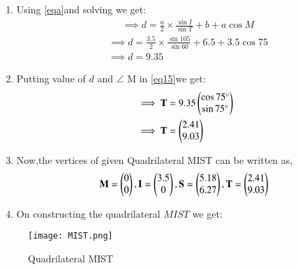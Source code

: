 \documentclass[journal,12pt,twocolumn]{IEEEtran}
\begin{document}
\begin{enumerate}
\item Using \eqref{eqa}and solving we get:
\begin{align}
&\implies d=\frac{a}{2}\times\frac{\sin I}{\sin T}+ b+a \cos M 
\end{align}
\begin{align}
&\implies d=\frac{3.5}{2}\times\frac{\sin 105}{\sin 60}+ 6.5+3.5 \cos75
\\
&\implies d=9.35
\end{align}
\item Putting value of $d$  and $\angle$ M in \eqref{eq15}we get:
\begin{align}
&\implies \mathbf{T} =9.35\begin{pmatrix}\cos 75 \degree\\\sin 75 \degree\end{pmatrix}
\\
&\implies \mathbf{T}=\begin{pmatrix}2.41\\9.03\end{pmatrix} 
\end{align}
   \item Now,the vertices of given Quadrilateral MIST can be written as,
\begin{align}
 \mathbf{M}=\begin{pmatrix}0\\0\end{pmatrix},\mathbf{I} = \begin{pmatrix}3.5\\0\end{pmatrix}, \mathbf{S}=\begin{pmatrix}5.18\\6.27\end{pmatrix},\mathbf{T}=\begin{pmatrix}2.41\\9.03\end{pmatrix} 
\end{align}
    \item On constructing the quadrilateral $MIST$ we get:
\end{enumerate}


\begin{figure}[!ht]
\centering
\texttt{[image: MIST.png]}
\caption{Quadrilateral MIST}
\label{fig:Quadrilateral MIST}	
\end{figure}
\end{document}
